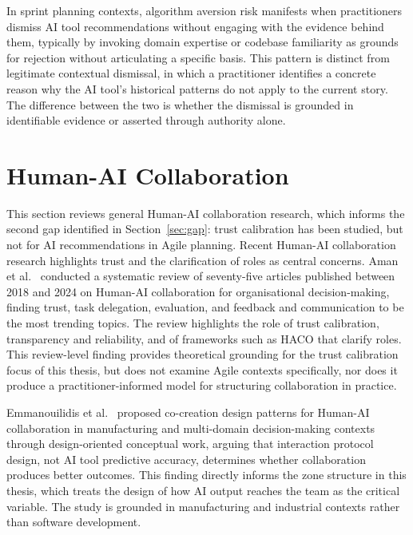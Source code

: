 \documentclass[a4paper,twoside]{bth}
\begin{document}
In sprint planning contexts, algorithm aversion risk manifests when practitioners dismiss AI tool recommendations without engaging with the evidence behind them, typically by invoking domain expertise or codebase familiarity as grounds for rejection without articulating a specific basis. This pattern is distinct from legitimate contextual dismissal, in which a practitioner identifies a concrete reason why the AI tool's historical patterns do not apply to the current story. The difference between the two is whether the dismissal is grounded in identifiable evidence or asserted through authority alone.

\section{Human-AI Collaboration}

This section reviews general Human-AI collaboration research, which informs the second gap identified in Section~\ref{sec:gap}: trust calibration has been studied, but not for AI recommendations in Agile planning. Recent Human-AI collaboration research highlights trust and the clarification of roles as central concerns. Aman et al.~\cite{aman2025systematic} conducted a systematic review of seventy-five articles published between 2018 and 2024 on Human-AI collaboration for organisational decision-making, finding trust, task delegation, evaluation, and feedback and communication to be the most trending topics. The review highlights the role of trust calibration, transparency and reliability, and of frameworks such as HACO that clarify roles. This review-level finding provides theoretical grounding for the trust calibration focus of this thesis, but does not examine Agile contexts specifically, nor does it produce a practitioner-informed model for structuring collaboration in practice.

Emmanouilidis et al.~\cite{emmanouilidis2025co} proposed co-creation design patterns for Human-AI collaboration in manufacturing and multi-domain decision-making contexts through design-oriented conceptual work, arguing that interaction protocol design, not AI tool predictive accuracy, determines whether collaboration produces better outcomes. This finding directly informs the zone structure in this thesis, which treats the design of how AI output reaches the team as the critical variable. The study is grounded in manufacturing and industrial contexts rather than software development.
\end{document}
